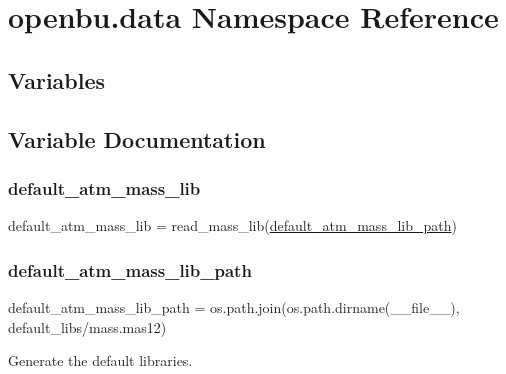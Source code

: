 \hypertarget{namespaceopenbu_1_1data}{}\section{openbu.\+data Namespace Reference}
\label{namespaceopenbu_1_1data}
\subsection*{Variables}


\subsection{Variable Documentation}
\mbox{\label{namespaceopenbu_1_1data_a2b51b403017d84d56e9c05a88904efa5}} 
\subsubsection{\texorpdfstring{default\+\_\+atm\+\_\+mass\+\_\+lib}{default\_atm\_mass\_lib}}
{\footnotesize\ttfamily default\+\_\+atm\+\_\+mass\+\_\+lib = read\+\_\+mass\+\_\+lib(\mbox{\hyperlink{namespaceopenbu_1_1data_a2abb22b21625654083aa2822200d4cca}{default\+\_\+atm\+\_\+mass\+\_\+lib\+\_\+path}})}

\mbox{\label{namespaceopenbu_1_1data_a2abb22b21625654083aa2822200d4cca}} 
\subsubsection{\texorpdfstring{default\+\_\+atm\+\_\+mass\+\_\+lib\+\_\+path}{default\_atm\_mass\_lib\_path}}
{\footnotesize\ttfamily default\+\_\+atm\+\_\+mass\+\_\+lib\+\_\+path = os.\+path.\+join(os.\+path.\+dirname(\+\_\+\+\_\+file\+\_\+\+\_\+), \textquotesingle{}default\+\_\+libs/mass.\+mas12\textquotesingle{})}



Generate the default libraries. 

